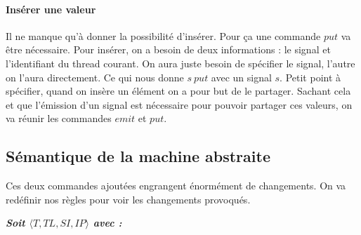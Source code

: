 \documentclass[10pt,a4paper]{report}
\begin{document}
\paragraph{Insérer une valeur}

Il ne manque qu'à donner la possibilité d'insérer. Pour ça une commande $put$ va être nécessaire. Pour insérer, on a besoin de deux informations : le signal et l'identifiant du thread courant. On aura juste besoin de spécifier le signal, l'autre on l'aura directement. Ce qui nous donne $s~put$ avec un signal $s$. 
\smallbreak
Petit point à spécifier, quand on insère un élément on a pour but de le partager. Sachant cela et que l'émission d'un signal est nécessaire pour pouvoir partager ces valeurs, on va réunir les commandes $emit$ et $put$. 
\bigbreak
\bigbreak




\subsection{Sémantique de la machine abstraite}

Ces deux commandes ajoutées engrangent énormément de changements. On va redéfinir nos règles pour voir les changements provoqués. 
\bigbreak

\textbf{\textit{Soit $\langle T,TL,SI,IP\rangle$ avec :}}
\end{document}
